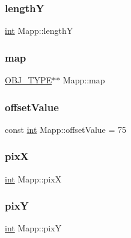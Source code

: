 \subsubsection{\texorpdfstring{lengthY}{lengthY}}
{\footnotesize\ttfamily \mbox{\hyperlink{draw_8hh_aa620a13339ac3a1177c86edc549fda9b}{int}} Mapp\+::lengthY\hspace{0.3cm}{\ttfamily [protected]}}

\mbox{\label{class_mapp_a91181e95875bc82d03e832b9d901cb59}} 
\subsubsection{\texorpdfstring{map}{map}}
{\footnotesize\ttfamily \mbox{\hyperlink{map_8hh_a714b9c2c276fbae637fee36453d9121e}{O\+B\+J\+\_\+\+T\+Y\+PE}}$\ast$$\ast$ Mapp\+::map\hspace{0.3cm}{\ttfamily [protected]}}

\mbox{\label{class_mapp_a7a9008b7100b25833c4aff1753dc8eec}} 
\subsubsection{\texorpdfstring{offsetValue}{offsetValue}}
{\footnotesize\ttfamily const \mbox{\hyperlink{draw_8hh_aa620a13339ac3a1177c86edc549fda9b}{int}} Mapp\+::offset\+Value = 75\hspace{0.3cm}{\ttfamily [protected]}}

\mbox{\label{class_mapp_a0d751ee7f6aacc352c1ffb1bf95c21af}} 
\subsubsection{\texorpdfstring{pixX}{pixX}}
{\footnotesize\ttfamily \mbox{\hyperlink{draw_8hh_aa620a13339ac3a1177c86edc549fda9b}{int}} Mapp\+::pixX\hspace{0.3cm}{\ttfamily [protected]}}

\mbox{\label{class_mapp_a756d60b3d694342b7c75621c8559c00e}} 
\subsubsection{\texorpdfstring{pixY}{pixY}}
{\footnotesize\ttfamily \mbox{\hyperlink{draw_8hh_aa620a13339ac3a1177c86edc549fda9b}{int}} Mapp\+::pixY\hspace{0.3cm}{\ttfamily [protected]}}

